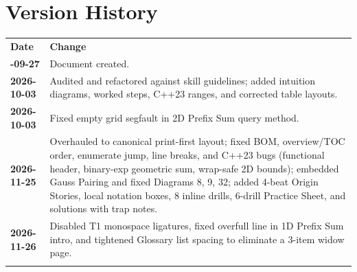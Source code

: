 \documentclass[11pt,a4paper]{article}
\theoremstyle{definition}
\begin{document}
\section*{Version History}

\begin{center}
\begingroup
\small
{}
\begin{tabularx}{\textwidth}{>{\bfseries}l >{\raggedright\arraybackslash}X}
\arrayrulecolor{primaryblue}\toprule[1.2pt]
\rowcolor{primaryblue!10}
\textcolor{primaryblue}{\textbf{Date}} & \textcolor{primaryblue}{\textbf{Change}} \\
\arrayrulecolor{codeframe}\midrule[0.6pt]
2026-09-27 & Document created. \\
2026-10-03 & Audited and refactored against skill guidelines; added intuition diagrams, worked steps, C++23 ranges, and corrected table layouts. \\
2026-10-03 & Fixed empty grid segfault in 2D Prefix Sum query method. \\
2026-11-25 & Overhauled to canonical print-first layout; fixed BOM, overview/TOC order, enumerate jump, line breaks, and C++23 bugs (functional header, binary-exp geometric sum, wrap-safe 2D bounds); embedded Gauss Pairing and fixed Diagrams 8, 9, 32; added 4-beat Origin Stories, local notation boxes, 8 inline drills, 6-drill Practice Sheet, and solutions with trap notes. \\
2026-11-26 & Disabled T1 monospace ligatures, fixed overfull line in 1D Prefix Sum intro, and tightened Glossary list spacing to eliminate a 3-item widow page. \\
\arrayrulecolor{primaryblue}\bottomrule[1.2pt]
\end{tabularx}
\endgroup
\end{center}
\end{document}

